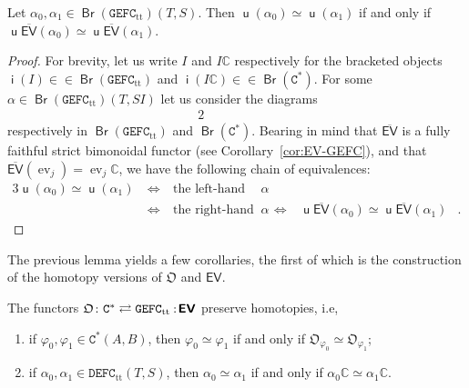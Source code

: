 \documentclass[10pt]{simplearticle}
\newcommand{\tikzinput}[1]{}
\newcommand{\ev}{\operatorname{ev}}
\newcommand{\GEFC}{\mathbb{\mathtt{GEFC}}}
\newcommand{\DEFC}{\mathbb{\mathtt{DEFC}}}
\newcommand{\Cstar}{\mathtt{C^{*}}}
\newcommand{\mathsb}[1]{\boldsymbol{\mathsf{#1}}}
\newcommand{\Br}{\operatorname{\mathsb{Br}}}
\renewcommand{\i}{\operatorname{\mathsb i}}
\renewcommand{\u}{\operatorname{\mathsb u}}
\newcommand{\EV}{\mathsb{EV}}
\newcommand{\ttt}{\operatorname{tt}}
\newcommand{\noloc}{\nobreak
\mspace{4mu plus 1mu}
{:}
\nonscript\mkern-\thinmuskip
\mathpunct{}
\mspace{2mu}
}
\begin{document}
\begin{lem}\label{lem:br-homot}
Let
$\alpha_{0},\alpha_{1}\in\Br(\GEFC_{\ttt})(T,S)$.
Then $\u(\alpha_{0})\simeq\u(\alpha_{1})$ if and only if $\u\overline{\EV}(\alpha_{0})\simeq\u\overline{\EV}(\alpha_{1})$.
\end{lem}

\begin{proof}
For brevity, let us write $I$ and $I\mathbb{C}$ respectively for
the bracketed objects $\i(I)\in\in\Br(\GEFC_{\ttt})$ and $\i(I\mathbb{C})\in\in\Br(\Cstar)$.
For some $\alpha\in\Br(\GEFC_{\ttt})(T,SI)$ let us consider the diagrams
\begin{alignat*}{2}
\tikzinput{d402} & \qquad\qquad & \tikzinput{d403}
\end{alignat*}
respectively in $\Br(\GEFC_{\ttt})$ and $\Br(\Cstar)$. Bearing in
mind that $\overline{\EV}$ is a fully faithful strict bimonoidal
functor (see Corollary~\ref{cor:EV-GEFC}), and that $\overline{\EV}(\ev_{j})=\ev_{j}\mathbb{C}$,
we have the following chain of equivalences:
\begin{alignat*}{3}
\u(\alpha_{0})\simeq\u(\alpha_{1})~ & \Longleftrightarrow~ & \textrm{the left-hand diagram above commutes for some }\alpha\\
 & \Longleftrightarrow & \textrm{the right-hand diagram above commutes for some }\alpha & ~\Longleftrightarrow~ & \u\overline{\EV}(\alpha_{0})\simeq\u\overline{\EV}(\alpha_{1}) & .
\end{alignat*}
\end{proof}

The previous lemma yields a few corollaries, the first of which is
the construction of the homotopy versions of $\mathfrak{O}$ and $\EV$.
\begin{lem}\label{lem:O-pres-homot}
The functors $\mathfrak{O}\colon\Cstar\rightleftarrows\GEFC_{\ttt}\noloc\EV$
preserve homotopies, i.e,
\begin{enumerate}
\item\label{enu:pres-homot-O}if $\varphi_{0},\varphi_{1}\in\Cstar(A,B)$,
then $\varphi_{0}\simeq\varphi_{1}$ if and only if $\mathfrak{O}_{\varphi_{0}}\simeq\mathfrak{O}_{\varphi_{1}}$;
\item\label{enu:pres-homot-EV}if $\alpha_{0},\alpha_{1}\in\DEFC_{\ttt}(T,S)$,
then $\alpha_{0}\simeq\alpha_{1}$ if and only if $\alpha_{0}\mathbb{C}\simeq\alpha_{1}\mathbb{C}$.
\end{enumerate}
\end{lem}
\end{document}
